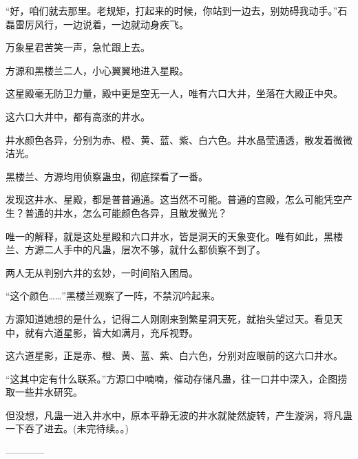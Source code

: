 \begin{this_body}
“好，咱们就去那里。老规矩，打起来的时候，你站到一边去，别妨碍我动手。”石磊雷厉风行，一边说着，一边就动身疾飞。

万象星君苦笑一声，急忙跟上去。

方源和黑楼兰二人，小心翼翼地进入星殿。

这星殿毫无防卫力量，殿中更是空无一人，唯有六口大井，坐落在大殿正中央。

这六口大井中，都有高涨的井水。

井水颜色各异，分别为赤、橙、黄、蓝、紫、白六色。井水晶莹通透，散发着微微洁光。

黑楼兰、方源均用侦察蛊虫，彻底探看了一番。

发现这井水、星殿，都是普普通通。这当然不可能。普通的宫殿，怎么可能凭空产生？普通的井水，怎么可能颜色各异，且散发微光？

唯一的解释，就是这处星殿和六口井水，皆是洞天的天象变化。唯有如此，黑楼兰、方源二人手中的凡蛊，层次不够，就什么都侦察不到了。

两人无从判别六井的玄妙，一时间陷入困局。

“这个颜色……”黑楼兰观察了一阵，不禁沉吟起来。

方源知道她想的是什么，记得二人刚刚来到繁星洞天死，就抬头望过天。看见天中，就有六道星影，皆大如满月，充斥视野。

这六道星影，正是赤、橙、黄、蓝、紫、白六色，分别对应眼前的这六口井水。

“这其中定有什么联系。”方源口中喃喃，催动存储凡蛊，往一口井中深入，企图捞取一些井水研究。

但没想，凡蛊一进入井水中，原本平静无波的井水就陡然旋转，产生漩涡，将凡蛊一下吞了进去。(未完待续。。)

------------

\end{this_body}

